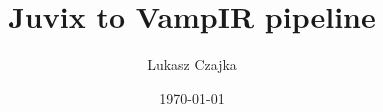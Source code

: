 \date{\today}

\title{Juvix to VampIR pipeline}

\begin{authgrp}
\author{Lukasz Czajka}
\end{authgrp}